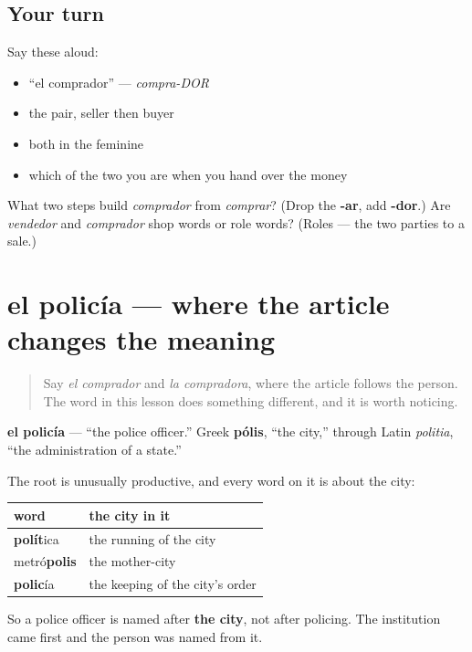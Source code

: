 \subsection*{Your turn}
Say these aloud:

\begin{itemize}
\raggedright
  \item \textquotedblleft{}el comprador\textquotedblright{} — \emph{compra-DOR}
  \item the pair, seller then buyer
  \item both in the feminine
  \item which of the two you are when you hand over the money
\end{itemize}

\begin{tcolorbox}[breakable,colback=teal!4,colframe=teal!35!black,title={Before you move on}]
What two steps build \emph{comprador} from \emph{comprar}? (Drop the \textbf{-ar}, add \textbf{-dor}.) Are \emph{vendedor} and \emph{comprador} shop words or role words? (Roles — the two parties to a sale.)
\end{tcolorbox}
\section[el policía]{el policía — where the article changes the meaning}

\label{lesson:ES-C427-policia}



\begin{quote}
Say \emph{el comprador} and \emph{la compradora}, where the article follows the person. The word in this lesson does something different, and it is worth noticing.
\end{quote}

\begin{cousinweb}
\textbf{el policía} — \textquotedblleft{}the police officer.\textquotedblright{} Greek \textbf{pólis}, \textquotedblleft{}the city,\textquotedblright{} through Latin \emph{politia}, \textquotedblleft{}the administration of a state.\textquotedblright{}

The root is unusually productive, and every word on it is about the city:

\noindent
\begin{tabularx}{\linewidth}{@{}>{\raggedright\arraybackslash}X>{\raggedright\arraybackslash}X@{}}
\toprule
\textbf{word} & \textbf{the city in it} \\
\midrule
\textbf{polít}ica & the running of the city \\
metró\textbf{polis} & the mother-city \\
\textbf{polic}ía & the keeping of the city's order \\
\bottomrule
\end{tabularx}

So a police officer is named after \textbf{the city}, not after policing. The institution came first and the person was named from it.
\end{cousinweb}

